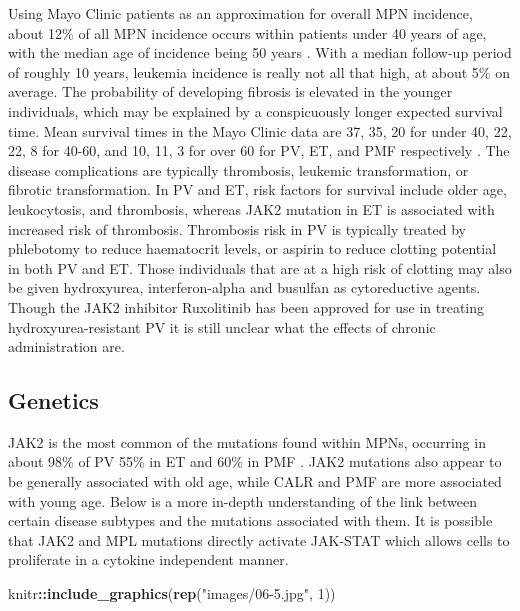 \documentclass[]{book}
\newenvironment{Shaded}{\begin{snugshade}}{\end{snugshade}}
\newcommand{\DecValTok}[1]{\textcolor[rgb]{0.00,0.00,0.81}{#1}}
\newcommand{\KeywordTok}[1]{\textcolor[rgb]{0.13,0.29,0.53}{\textbf{#1}}}
\newcommand{\NormalTok}[1]{#1}
\newcommand{\OperatorTok}[1]{\textcolor[rgb]{0.81,0.36,0.00}{\textbf{#1}}}
\newcommand{\StringTok}[1]{\textcolor[rgb]{0.31,0.60,0.02}{#1}}
\begin{document}
\citep{grinfeld2018classification}

Using Mayo Clinic patients as an approximation for overall MPN incidence, about 12\% of all MPN incidence occurs within patients under 40 years of age, with the median age of incidence being 50 years \citep{szuber2018myeloproliferative}. With a median follow-up period of roughly 10 years, leukemia incidence is really not all that high, at about 5\% on average. The probability of developing fibrosis is elevated in the younger individuals, which may be explained by a conspicuously longer expected survival time. Mean survival times in the Mayo Clinic data are 37, 35, 20 for under 40, 22, 22, 8 for 40-60, and 10, 11, 3 for over 60 for PV, ET, and PMF respectively \citep{szuber2018myeloproliferative, tefferi2015myeloproliferative}. The disease complications are typically thrombosis, leukemic transformation, or fibrotic transformation. In PV and ET, risk factors for survival include older age, leukocytosis, and thrombosis, whereas JAK2 mutation in ET is associated with increased risk of thrombosis. Thrombosis risk in PV is typically treated by phlebotomy to reduce haematocrit levels, or aspirin to reduce clotting potential in both PV and ET. Those individuals that are at a high risk of clotting may also be given hydroxyurea, interferon-alpha and busulfan as cytoreductive agents. Though the JAK2 inhibitor Ruxolitinib has been approved for use in treating hydroxyurea-resistant PV it is still unclear what the effects of chronic administration are.

\hypertarget{genetics}{%
\subsection{Genetics}\label{genetics}}

JAK2 is the most common of the mutations found within MPNs, occurring in about 98\% of PV 55\% in ET and 60\% in PMF \citep{tefferi2015myeloproliferative}. JAK2 mutations also appear to be generally associated with old age, while CALR and PMF are more associated with young age. Below is a more in-depth understanding of the link between certain disease subtypes and the mutations associated with them. It is possible that JAK2 and MPL mutations directly activate JAK-STAT which allows cells to proliferate in a cytokine independent manner.

\begin{Shaded}
\begin{Highlighting}[]
\NormalTok{knitr}\OperatorTok{::}\KeywordTok{include_graphics}\NormalTok{(}\KeywordTok{rep}\NormalTok{(}\StringTok{"images/06-5.jpg"}\NormalTok{, }\DecValTok{1}\NormalTok{))          }
\end{Highlighting}
\end{Shaded}
\end{document}
